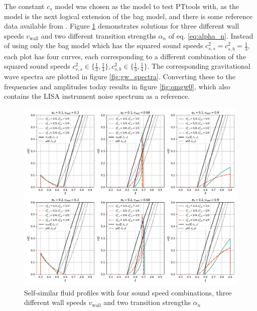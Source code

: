 The constant $c_s$ model was chosen as the model to test PTtools with,
as the model is the next logical extension of the bag model,
and there is some reference data available from \cites{giese_2020}{giese_2021}.
Figure \ref{fig:fluid_profiles} demonstrates solutions for three different wall speeds $v_\text{wall}$ and two different transition strengths $\alpha_n$ of eq. \eqref{eq:alpha_n}.
Instead of using only the bag model which has the squared sound speeds $c_{s,s}^2 = c_{s,b}^2 = \frac{1}{3}$,
each plot has four curves, each corresponding to a different combination of the squared sound speeds
$c_{s,s}^2 \in \{ \frac{1}{3}, \frac{1}{4} \}, c_{s,b}^2 \in \{ \frac{1}{3}, \frac{1}{4} \}$.
The corresponding gravitational wave spectra are plotted in figure \ref{fig:gw_spectra}.
Converting these to the frequencies and amplitudes today results in figure \ref{fig:omgw0},
which also contains the LISA instrument noise spectrum as a reference.

\begin{figure}[ht!]
\centering
\includegraphics[width=\textwidth]{fig/const_cs_gw_v.pdf}
\caption{Self-similar fluid profiles with four sound speed combinations, three different wall speeds $v_\text{wall}$ and two transition strengths $\alpha_n$}
\label{fig:fluid_profiles}
\end{figure}

